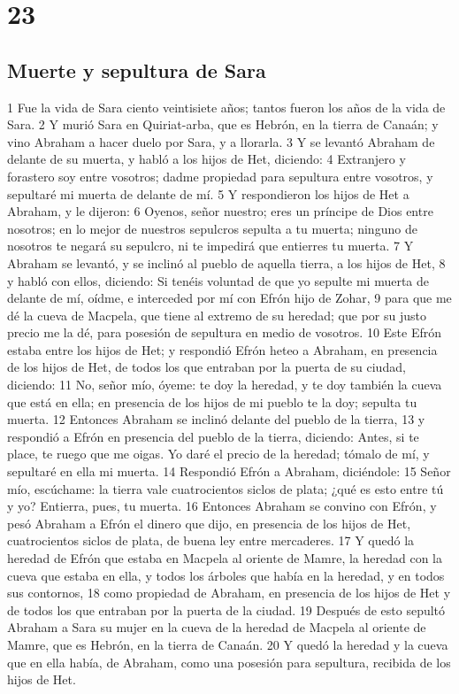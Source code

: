 \chapter{23}

\section*{Muerte y sepultura de Sara}

1 Fue la vida de Sara ciento veintisiete años; tantos fueron los años de la vida de Sara.
2 Y murió Sara en Quiriat-arba, que es Hebrón, en la tierra de Canaán; y vino Abraham a hacer duelo por Sara, y a llorarla.
3 Y se levantó Abraham de delante de su muerta, y habló a los hijos de Het, diciendo:
4 Extranjero y forastero soy entre vosotros; dadme propiedad para sepultura entre vosotros, y sepultaré mi muerta de delante de mí.
5 Y respondieron los hijos de Het a Abraham, y le dijeron:
6 Oyenos, señor nuestro; eres un príncipe de Dios entre nosotros; en lo mejor de nuestros sepulcros sepulta a tu muerta; ninguno de nosotros te negará su sepulcro, ni te impedirá que entierres tu muerta.
7 Y Abraham se levantó, y se inclinó al pueblo de aquella tierra, a los hijos de Het,
8 y habló con ellos, diciendo: Si tenéis voluntad de que yo sepulte mi muerta de delante de mí, oídme, e interceded por mí con Efrón hijo de Zohar,
9 para que me dé la cueva de Macpela, que tiene al extremo de su heredad; que por su justo precio me la dé, para posesión de sepultura en medio de vosotros.
10 Este Efrón estaba entre los hijos de Het; y respondió Efrón heteo a Abraham, en presencia de los hijos de Het, de todos los que entraban por la puerta de su ciudad, diciendo:
11 No, señor mío, óyeme: te doy la heredad, y te doy también la cueva que está en ella; en presencia de los hijos de mi pueblo te la doy; sepulta tu muerta.
12 Entonces Abraham se inclinó delante del pueblo de la tierra,
13 y respondió a Efrón en presencia del pueblo de la tierra, diciendo: Antes, si te place, te ruego que me oigas. Yo daré el precio de la heredad; tómalo de mí, y sepultaré en ella mi muerta.
14 Respondió Efrón a Abraham, diciéndole:
15 Señor mío, escúchame: la tierra vale cuatrocientos siclos de plata; ¿qué es esto entre tú y yo? Entierra, pues, tu muerta.
16 Entonces Abraham se convino con Efrón, y pesó Abraham a Efrón el dinero que dijo, en presencia de los hijos de Het, cuatrocientos siclos de plata, de buena ley entre mercaderes.
17 Y quedó la heredad de Efrón que estaba en Macpela al oriente de Mamre, la heredad con la cueva que estaba en ella, y todos los árboles que había en la heredad, y en todos sus contornos,
18 como propiedad de Abraham, en presencia de los hijos de Het y de todos los que entraban por la puerta de la ciudad.
19 Después de esto sepultó Abraham a Sara su mujer en la cueva de la heredad de Macpela al oriente de Mamre, que es Hebrón, en la tierra de Canaán.
20 Y quedó la heredad y la cueva que en ella había, de Abraham, como una posesión para sepultura, recibida de los hijos de Het.

